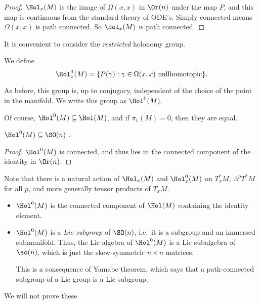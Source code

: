 \documentclass[a4paper]{article}
\begin{document}
\begin{proof}
  $\Hol_x(M)$ is the image of $\Omega(x, x)$ in $\Or(n)$ under the map $P$, and this map is continuous from the standard theory of ODE's. Simply connected means $\Omega(x, x)$ is path connected. So $\Hol_x(M)$ is path connected.
\end{proof}

It is convenient to consider the \emph{restricted} holonomy group.

\begin{defi}
  We define
  \[
    \Hol_x^0(M) = \{P(\gamma): \gamma \in \Omega(x, x) \text{ nullhomotopic}\}.
  \]
\end{defi}
As before, this group is, up to conjugacy, independent of the choice of the point in the manifold. We write this group as $\Hol^0(M)$.

Of course, $\Hol^0(M) \subseteq \Hol(M)$, and if $\pi_1(M) = 0$, then they are equal.

\begin{cor}
  $\Hol^0(M) \subseteq \SO(n)$ .
\end{cor}

\begin{proof}
  $\Hol^0(M)$ is connected, and thus lies in the connected component of the identity in $\Or(n)$.
\end{proof}

Note that there is a natural action of $\Hol_x(M)$ and $\Hol^0_x(M)$ on $T^*_x M$, $\Lambda^p T^*M$ for all $p$, and more generally tensor products of $T_xM$.

\begin{fact}\leavevmode
  \begin{itemize}
    \item $\Hol^0(M)$ is the connected component of $\Hol(M)$ containing the identity element.
    \item $\Hol^0(M)$ is a \emph{Lie subgroup} of $\SO(n)$, i.e.\ it is a subgroup and an immersed submanifold. Thus, the Lie algebra of $\Hol^0(M)$ is a Lie subalgebra of $\so(n)$, which is just the skew-symmetric $n \times n$ matrices.

      This is a consequence of Yamabe theorem, which says that a path-connected subgroup of a Lie group is a Lie subgroup.
  \end{itemize}
\end{fact}
We will not prove these.
\end{document}
